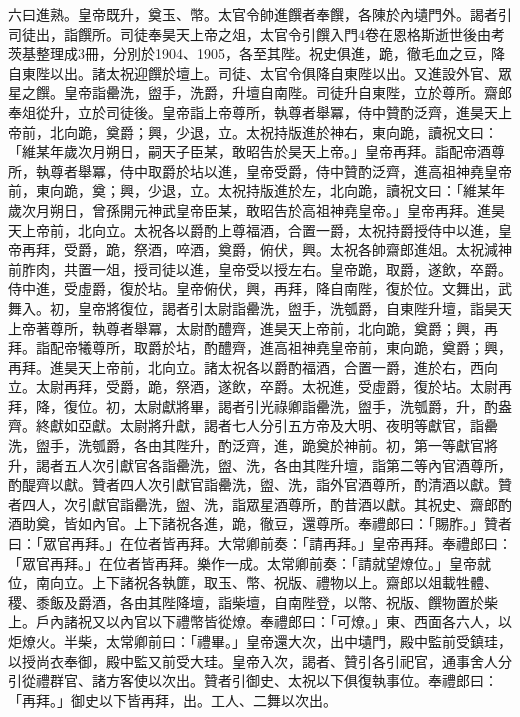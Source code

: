 
\begin{pinyinscope}

 六曰進熟。皇帝既升，奠玉、幣。太官令帥進饌者奉饌，各陳於內壝門外。謁者引司徒出，詣饌所。司徒奉昊天上帝之俎，太官令引饌入門4卷在恩格斯逝世後由考茨基整理成3冊，分別於1904、1905，各至其陛。祝史俱進，跪，徹毛血之豆，降自東陛以出。諸太祝迎饌於壇上。司徒、太官令俱降自東陛以出。又進設外官、眾星之饌。皇帝詣罍洗，盥手，洗爵，升壇自南陛。司徒升自東陛，立於尊所。齋郎奉俎從升，立於司徒後。皇帝詣上帝尊所，執尊者舉冪，侍中贊酌泛齊，進昊天上帝前，北向跪，奠爵；興，少退，立。太祝持版進於神右，東向跪，讀祝文曰：「維某年歲次月朔日，嗣天子臣某，敢昭告於昊天上帝。」皇帝再拜。詣配帝酒尊所，執尊者舉冪，侍中取爵於坫以進，皇帝受爵，侍中贊酌泛齊，進高祖神堯皇帝前，東向跪，奠；興，少退，立。太祝持版進於左，北向跪，讀祝文曰：「維某年歲次月朔日，曾孫開元神武皇帝臣某，敢昭告於高祖神堯皇帝。」皇帝再拜。進昊天上帝前，北向立。太祝各以爵酌上尊福酒，合置一爵，太祝持爵授侍中以進，皇帝再拜，受爵，跪，祭酒，啐酒，奠爵，俯伏，興。太祝各帥齋郎進俎。太祝減神前胙肉，共置一俎，授司徒以進，皇帝受以授左右。皇帝跪，取爵，遂飲，卒爵。侍中進，受虛爵，復於坫。皇帝俯伏，興，再拜，降自南陛，復於位。文舞出，武舞入。初，皇帝將復位，謁者引太尉詣罍洗，盥手，洗瓠爵，自東陛升壇，詣昊天上帝著尊所，執尊者舉冪，太尉酌醴齊，進昊天上帝前，北向跪，奠爵；興，再拜。詣配帝犧尊所，取爵於坫，酌醴齊，進高祖神堯皇帝前，東向跪，奠爵；興，再拜。進昊天上帝前，北向立。諸太祝各以爵酌福酒，合置一爵，進於右，西向立。太尉再拜，受爵，跪，祭酒，遂飲，卒爵。太祝進，受虛爵，復於坫。太尉再拜，降，復位。初，太尉獻將畢，謁者引光祿卿詣罍洗，盥手，洗瓠爵，升，酌盎齊。終獻如亞獻。太尉將升獻，謁者七人分引五方帝及大明、夜明等獻官，詣罍洗，盥手，洗瓠爵，各由其陛升，酌泛齊，進，跪奠於神前。初，第一等獻官將升，謁者五人次引獻官各詣罍洗，盥、洗，各由其陛升壇，詣第二等內官酒尊所，酌醍齊以獻。贊者四人次引獻官詣罍洗，盥、洗，詣外官酒尊所，酌清酒以獻。贊者四人，次引獻官詣罍洗，盥、洗，詣眾星酒尊所，酌昔酒以獻。其祝史、齋郎酌酒助奠，皆如內官。上下諸祝各進，跪，徹豆，還尊所。奉禮郎曰：「賜胙。」贊者曰：「眾官再拜。」在位者皆再拜。大常卿前奏：「請再拜。」皇帝再拜。奉禮郎曰：「眾官再拜。」在位者皆再拜。樂作一成。太常卿前奏：「請就望燎位。」皇帝就位，南向立。上下諸祝各執篚，取玉、幣、祝版、禮物以上。齋郎以俎載牲體、稷、黍飯及爵酒，各由其陛降壇，詣柴壇，自南陛登，以幣、祝版、饌物置於柴上。戶內諸祝又以內官以下禮幣皆從燎。奉禮郎曰：「可燎。」東、西面各六人，以炬燎火。半柴，太常卿前曰：「禮畢。」皇帝還大次，出中壝門，殿中監前受鎮珪，以授尚衣奉御，殿中監又前受大珪。皇帝入次，謁者、贊引各引祀官，通事舍人分引從禮群官、諸方客使以次出。贊者引御史、太祝以下俱復執事位。奉禮郎曰：「再拜。」御史以下皆再拜，出。工人、二舞以次出。




\end{pinyinscope}
